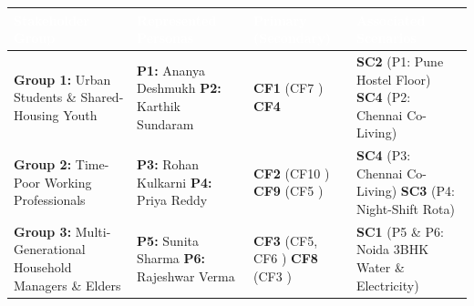 \documentclass[12pt, a4paper]{article}
\begin{document}
\begin{longtable}{|>{\raggedright\arraybackslash}p{4.1cm}|>{\raggedright\arraybackslash}p{4.3cm}|>{\raggedright\arraybackslash}p{2.9cm}|>{\raggedright\arraybackslash}p{4.2cm}|}
\hline
\rowcolor{cNavy}
\textcolor{white}{\textbf{Stakeholder Group}} & \textcolor{white}{\textbf{Represented Personas}} & \textcolor{white}{\textbf{Primary (Secondary)}} & \textcolor{white}{\textbf{Associated Scenarios}} \\
\hline
\textbf{Group 1:} Urban Students \& Shared-Housing Youth & \textbf{P1:} Ananya Deshmukh \newline \textbf{P2:} Karthik Sundaram & \textbf{CF1} \cite{cf1} (CF7 \cite{cf7}) \newline \textbf{CF4} \cite{cf4} & \textbf{SC2} (P1: Pune Hostel Floor) \newline \textbf{SC4} (P2: Chennai Co-Living) \\
\hline
\textbf{Group 2:} Time-Poor Working Professionals & \textbf{P3:} Rohan Kulkarni \newline \textbf{P4:} Priya Reddy & \textbf{CF2} \cite{cf2} (CF10 \cite{cf10}) \newline \textbf{CF9} \cite{cf9} (CF5 \cite{cf5}) & \textbf{SC4} (P3: Chennai Co-Living) \newline \textbf{SC3} (P4: Night-Shift Rota) \\
\hline
\textbf{Group 3:} Multi-Generational Household Managers \& Elders & \textbf{P5:} Sunita Sharma \newline \textbf{P6:} Rajeshwar Verma & \textbf{CF3} \cite{cf3} (CF5, CF6 \cite{cf5, cf6}) \newline \textbf{CF8} \cite{cf8} (CF3 \cite{cf3}) & \textbf{SC1} (P5 \& P6: Noida 3BHK Water \& Electricity) \\
\hline
\end{longtable}
\end{document}
